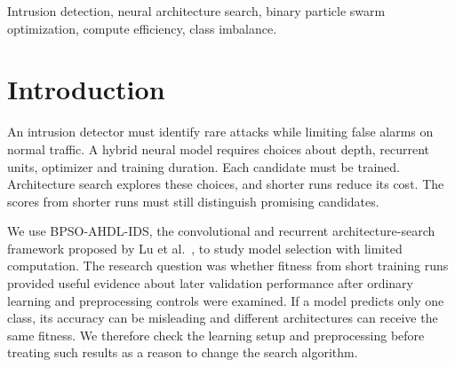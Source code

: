 \begin{abstract}
Neural architecture search for intrusion detection requires useful evaluation under limited compute. This project retains a 73-bit BPSO CNN--RNN framework and investigates multi-fidelity allocation on real Gas Pipeline data. An earlier archive-based uncertainty-aware (UA) method reduced online GPU use but required 403.82 GPU seconds of predictor observations, eliminating end-to-end savings. We implement an archive-free candidate that begins as BPSO with successive halving (SH). It learns only from search-generated observations using architecture-disjoint, prequentially checked CPU prediction. In 42 fresh compute-limited runs across three seeds, the full archive-free method used 11.947 GPU seconds on average. This is the mean time to reach a validation macro-F1 of 0.6 or to exhaust the cap. Standard BPSO used 16.824 GPU seconds, giving a reduction of 28.99\% in total GPU computation. Targets were attained in 2/3 versus 1/3 seeds. However, predictive promotion never activated in the short searches. Results matched ordinary halving, so the measured saving is attributable to multi-fidelity fallback rather than online uncertainty learning. DEHB, the strongest baseline, reached 3/3 targets using 6.778 GPU seconds. Existing test results use a historical split already known during development. The work supports reproducible engineering and removal of archive overhead; superiority or novelty of uncertainty-aware optimization remains unsupported.
\end{abstract}
\begin{IEEEkeywords}
Intrusion detection, neural architecture search, binary particle swarm optimization, compute efficiency, class imbalance.
\end{IEEEkeywords}

\section{Introduction}
An intrusion detector must identify rare attacks while limiting false alarms on normal traffic. A hybrid neural model requires choices about depth, recurrent units, optimizer and training duration. Each candidate must be trained. Architecture search explores these choices, and shorter runs reduce its cost. The scores from shorter runs must still distinguish promising candidates.

We use BPSO-AHDL-IDS, the convolutional and recurrent architecture-search framework proposed by Lu et al.~\cite{lu2025}, to study model selection with limited computation. The research question was whether fitness from short training runs provided useful evidence about later validation performance after ordinary learning and preprocessing controls were examined. If a model predicts only one class, its accuracy can be misleading and different architectures can receive the same fitness. We therefore check the learning setup and preprocessing before treating such results as a reason to change the search algorithm.

